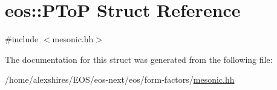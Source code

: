 \hypertarget{structeos_1_1PToP}{
\section{eos::PToP Struct Reference}
\label{structeos_1_1PToP}
}


{\ttfamily \#include $<$mesonic.hh$>$}

The documentation for this struct was generated from the following file:\begin{DoxyCompactItemize}
\item 
/home/alexshires/EOS/eos-\/next/eos/form-\/factors/\hyperlink{mesonic_8hh}{mesonic.hh}\end{DoxyCompactItemize}
